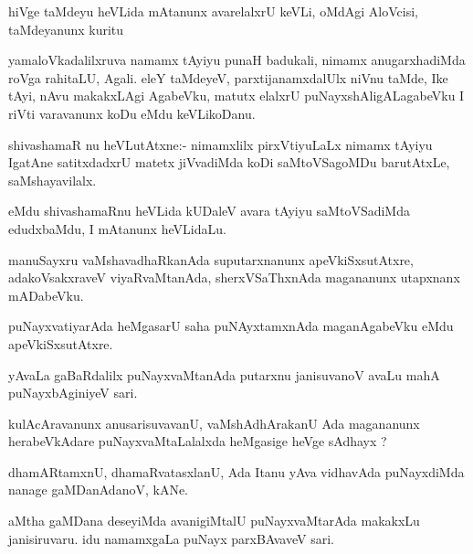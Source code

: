 \documentclass{article}
\begin{document}
\begin{mn}
hiVge taMdeyu  heVLida mAtanunx avarelalxrU keVLi, oMdAgi AloVcisi, taMdeyanunx kuritu
\end{mn}

\begin{mn}
yamaloVkadalilxruva namamx tAyiyu punaH badukali, nimamx anugarxhadiMda 
roVga rahitaLU, Agali. eleY taMdeyeV, parxtijanamxdalUlx niVnu taMde,
Ike tAyi, nAvu makakxLAgi AgabeVku, matutx elalxrU puNayxshAligALagabeVku
I riVti varavanunx koDu eMdu keVLikoDanu.
\end{mn}

\begin{mn}
shivashamaR	nu heVLutAtxne:- nimamxlilx pirxVtiyuLaLx nimamx tAyiyu
IgatAne satitxdadxrU matetx jiVvadiMda koDi saMtoVSagoMDu barutAtxLe, 
saMshayavilalx.
\end{mn}

\begin{mn}
eMdu shivashamaRnu heVLida kUDaleV avara tAyiyu saMtoVSadiMda edudxbaMdu,
 I mAtanunx heVLidaLu.
\end{mn}

\begin{mn}
manuSayxru vaMshavadhaRkanAda suputarxnanunx apeVkiSxsutAtxre,
adakoVsakxraveV viyaRvaMtanAda, sherxVSaThxnAda magananunx utapxnanx mADabeVku.
\end{mn}

\begin{mn}
puNayxvatiyarAda heMgasarU saha puNAyxtamxnAda maganAgabeVku eMdu apeVkiSxsutAtxre.
\end{mn}

\begin{mn}
yAvaLa gaBaRdalilx puNayxvaMtanAda putarxnu janisuvanoV avaLu mahA puNayxbAginiyeV sari.
\end{mn}

\begin{mn}
kulAcAravanunx anusarisuvavanU, vaMshAdhArakanU Ada magananunx
herabeVkAdare puNayxvaMtaLalalxda heMgasige heVge sAdhayx ?
\end{mn}

\begin{mn}
dhamARtamxnU, dhamaRvatasxlanU, Ada Itanu yAva vidhavAda puNayxdiMda 
nanage gaMDanAdanoV, kANe.
\end{mn}

\begin{mn}
aMtha gaMDana deseyiMda avanigiMtalU puNayxvaMtarAda makakxLu 
janisiruvaru. idu namamxgaLa puNayx parxBAvaveV sari.
\end{mn}
\end{document}
